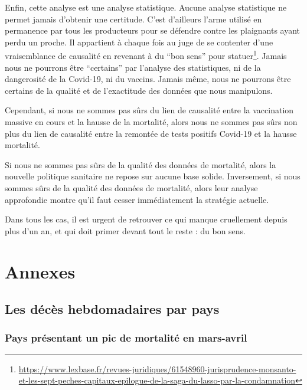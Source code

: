 \documentclass[
]{article}
\begin{document}
Enfin, cette analyse est une analyse statistique. Aucune analyse
statistique ne permet jamais d'obtenir une certitude. C'est d'ailleurs
l'arme utilisé en permanence par tous les producteurs pour se défendre
contre les plaignants ayant perdu un proche. Il appartient à chaque fois
au juge de se contenter d'une vraisemblance de causalité en revenant à
du ``bon sens'' pour statuer\footnote{\url{https://www.lexbase.fr/revues-juridiques/61548960-jurisprudence-monsanto-et-les-sept-peches-capitaux-epilogue-de-la-saga-du-lasso-par-la-condamnation}}.
Jamais nous ne pourrons être ``certains'' par l'analyse des
statistiques, ni de la dangerosité de la Covid-19, ni du vaccins. Jamais
même, nous ne pourrons être certains de la qualité et de l'exactitude
des données que nous manipulons.

Cependant, si nous ne sommes pas sûrs du lien de causalité entre la
vaccination massive en cours et la hausse de la mortalité, alors nous ne
sommes pas sûrs non plus du lien de causalité entre la remontée de tests
positifs Covid-19 et la hausse mortalité.

Si nous ne sommes pas sûrs de la qualité des données de mortalité, alors
la nouvelle politique sanitaire ne repose sur aucune base solide.
Inversement, si nous sommes sûrs de la qualité des données de mortalité,
alors leur analyse approfondie montre qu'il faut cesser immédiatement la
stratégie actuelle.

Dans tous les cas, il est urgent de retrouver ce qui manque cruellement
depuis plus d'un an, et qui doit primer devant tout le reste : du bon
sens.

\hypertarget{annexes}{%
\section{Annexes}\label{annexes}}

\hypertarget{les-duxe9cuxe8s-hebdomadaires-par-pays}{%
\subsection{Les décès hebdomadaires par
pays}\label{les-duxe9cuxe8s-hebdomadaires-par-pays}}

\hypertarget{pays-pruxe9sentant-un-pic-de-mortalituxe9-en-mars-avril}{%
\subsubsection{Pays présentant un pic de mortalité en
mars-avril}\label{pays-pruxe9sentant-un-pic-de-mortalituxe9-en-mars-avril}}
\end{document}
